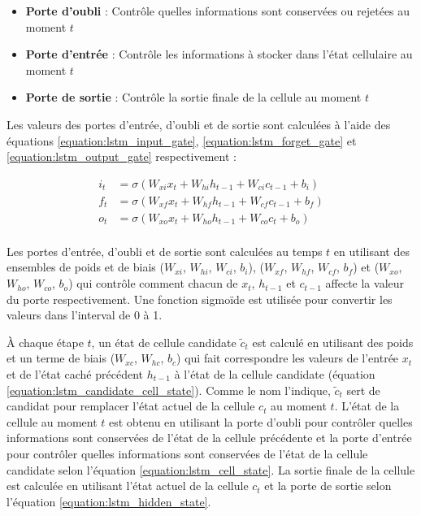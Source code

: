 \begin{itemize}
    \item \textbf{Porte d'oubli} : Contrôle quelles informations sont conservées ou rejetées au moment $t$
    \item \textbf{Porte d'entrée} : Contrôle les informations à stocker dans l'état cellulaire au moment $t$
    \item \textbf{Porte de sortie} : Contrôle la sortie finale de la cellule au moment $t$
\end{itemize}

Les valeurs des portes d'entrée, d'oubli et de sortie sont calculées à l'aide des équations \ref{equation:lstm_input_gate}, \ref{equation:lstm_forget_gate} et \ref{equation:lstm_output_gate} respectivement :

\begin{align}
i_t &= \sigma(W_{xi}x_t + W_{hi}h_{t-1}+W_{ci}c_{t-1}+b_i) \label{equation:lstm_input_gate}\\
f_t &= \sigma(W_{xf}x_t + W_{hf}h_{t-1}+W_{cf}c_{t-1}+b_f) \label{equation:lstm_forget_gate}\\
o_t &= \sigma(W_{xo}x_t + W_{ho}h_{t-1}+W_{co}c_t+b_o) \label{equation:lstm_output_gate}\\
\end{align}

Les portes d'entrée, d'oubli et de sortie sont calculées au temps $t$ en utilisant des ensembles de poids et de biais ($W_{xi}$, $W_{hi}$, $W_{ci}$, $b_i$), ($W_{xf}$, $W_{hf}$, $W_{cf}$, $b_f$) et ($W_{xo}$, $W_{ho}$, $W_{co}$, $b_o$) qui contrôle comment chacun de $x_t$, $h_{t-1}$ et $c_{t-1}$ affecte la valeur du porte respectivement. Une fonction sigmoïde est utilisée pour convertir les valeurs dans l'interval de 0 à 1. 

À chaque étape $t$, un état de cellule candidate $\tilde{c}_t$ est calculé en utilisant des poids et un terme de biais ($W_{xc}$, $W_{hc}$, $b_c$) qui fait correspondre les valeurs de l'entrée $x_t$ et de l'état caché précédent $h_{t-1}$ à l'état de la cellule candidate (équation \ref{equation:lstm_candidate_cell_state}). Comme le nom l'indique, $\tilde{c}_t$ sert de candidat pour remplacer l'état actuel de la cellule $c_t$ au moment $t$. L'état de la cellule au moment $t$ est obtenu en utilisant la porte d'oubli pour contrôler quelles informations sont conservées de l'état de la cellule précédente et la porte d'entrée pour contrôler quelles informations sont conservées de l'état de la cellule candidate selon l'équation \ref{equation:lstm_cell_state}. La sortie finale de la cellule est calculée en utilisant l'état actuel de la cellule $c_t$ et la porte de sortie selon l'équation \ref{equation:lstm_hidden_state}.

